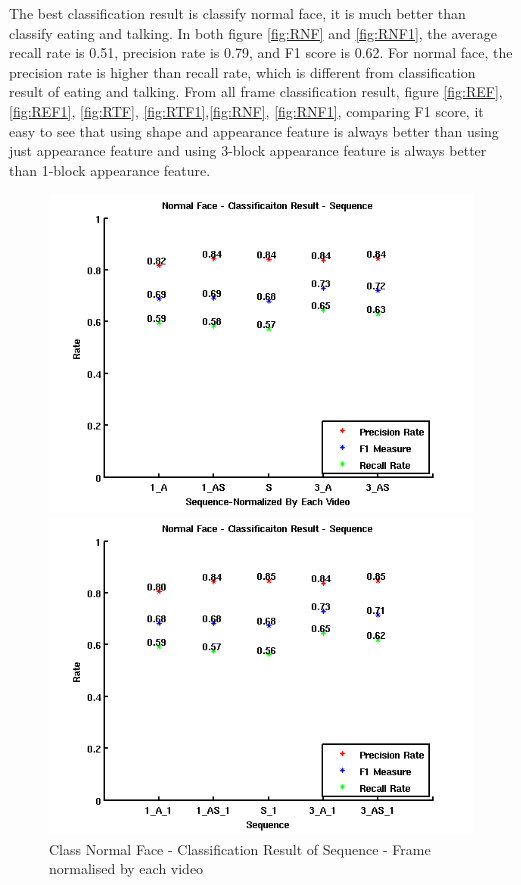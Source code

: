 \newline
The best classification result is classify normal face, it is much better than classify eating and talking. In both figure \ref{fig:RNF} and \ref{fig:RNF1}, the average recall rate is 0.51, precision rate is 0.79, and F1 score is 0.62. For normal face, the precision rate is higher than recall rate, which is different from classification result of eating and talking. From all frame classification result, figure \ref{fig:REF}, \ref{fig:REF1}, \ref{fig:RTF}, \ref{fig:RTF1},\ref{fig:RNF}, \ref{fig:RNF1}, comparing F1 score, it easy to see that using shape and appearance feature is always better than using just appearance feature and using 3-block appearance feature is always better than 1-block appearance feature.
\begin{figure}[ht]
\centering
\begin{minipage}{.5\textwidth}
  \centering
  \captionsetup{justification=centering,margin=1cm}
  \includegraphics[width=\linewidth]{imgs/Result_NormalFace_Sequence.png}
  \caption{Class Normal Face - Classification Result of Sequence - Frame normalised by each video}
  \label{fig:RNS}
\end{minipage}%
\begin{minipage}{.5\textwidth}
  \centering
  \captionsetup{justification=centering,margin=1cm}
  \includegraphics[width=\linewidth]{imgs/Result_NormalFace_Sequence_1.png}

\end{minipage}
\end{figure}
